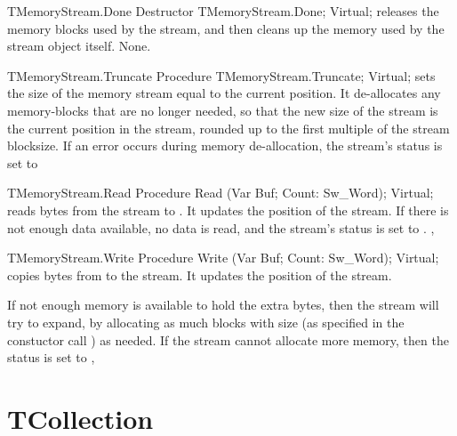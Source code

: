 \begin{procedure}{TMemoryStream.Done}
\Declaration
Destructor TMemoryStream.Done; Virtual;
\Description
{} releases the memory blocks used by the stream, and then cleans up
the memory used by the stream object itself.
\Errors
None.
\SeeAlso
{}
\end{procedure}

\begin{procedure}{TMemoryStream.Truncate}
\Declaration
Procedure TMemoryStream.Truncate; Virtual;
\Description
{} sets the size of the memory stream equal to the current
position. It de-allocates any memory-blocks that are no longer needed, so
that the new size of the stream is the current position in the stream,
rounded up to the first multiple of the stream blocksize.
\Errors 
If an error occurs during memory de-allocation, the stream's status is set
to 
\SeeAlso
{}
\end{procedure}

\begin{procedure}{TMemoryStream.Read}
\Declaration
Procedure Read (Var Buf; Count: Sw\_Word); Virtual;
\Description
{} reads  bytes from the stream to . It updates
the position of the stream.
\Errors
If there is not enough data available, no data is read, and the stream's
status is set to .
\SeeAlso
{}, 
\end{procedure}

\begin{procedure}{TMemoryStream.Write}
\Declaration
Procedure Write (Var Buf; Count: Sw\_Word); Virtual;
\Description
{} copies  bytes from  to the stream. It
updates the position of the stream. 

If not enough memory is available to hold the extra  bytes, 
then the stream will try to expand, by allocating as much blocks with 
size  (as specified in the constuctor call
) as needed. 
\Errors
If the stream cannot allocate more memory, then the status is set to
\SeeAlso
{}, 
\end{procedure}

\section{TCollection}
\label{se:TCollection}

